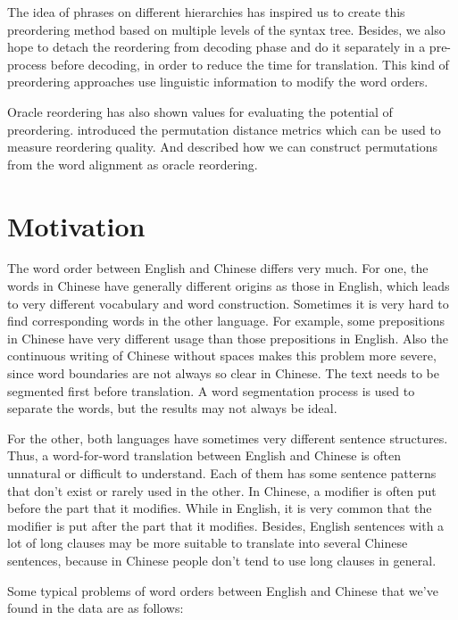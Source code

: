 \documentclass[a4paper]{article}
\begin{document}
The idea of phrases on different hierarchies has inspired us to create this preordering method based on multiple levels of the syntax tree. Besides, we also hope to detach the reordering from decoding phase and do it separately in a pre-process before decoding, in order to reduce the time for translation. This kind of preordering approaches use linguistic information to modify the word orders.

Oracle reordering has also shown values for evaluating the potential of preordering. \cite{metrics} introduced the permutation distance metrics which can be used to measure reordering quality. And \cite{birch2} described how we can construct permutations from the word alignment as oracle reordering.

\section{Motivation}

The word order between English and Chinese differs very much. For one, the words in Chinese have generally different origins as those in English, which leads to very different vocabulary and word construction. Sometimes it is very hard to find corresponding words in the other language. For example, some prepositions in Chinese have very different usage than those prepositions in English. Also the continuous writing of Chinese without spaces makes this problem more severe, since word boundaries are not always so clear in Chinese. The text needs to be segmented first before translation. A word segmentation process is used to separate the words, but the results may not always be ideal.

For the other, both languages have sometimes very different sentence structures. Thus, a word-for-word translation between English and Chinese is often unnatural or difficult to understand. Each of them has some sentence patterns that don't exist or rarely used in the other. In Chinese, a modifier is often put before the part that it modifies. While in English, it is very common that the modifier is put after the part that it modifies. Besides, English sentences with a lot of long clauses may be more suitable to translate into several Chinese sentences, because in Chinese people don't tend to use long clauses in general. 

Some typical problems of word orders between English and Chinese that we've found in the data are as follows:
\end{document}
